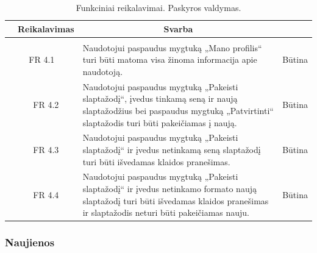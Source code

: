 \documentclass{VUMIFPSkursinis}
\begin{document}
\begin{table}[H]
	\caption{Funkciniai reikalavimai. Paskyros valdymas.}
	\begin{tabular}{|p{1cm}|p{1cm}|p{}|p{}|}
		\hline 
		\rowcolor{gray!50}
		\multicolumn{2}{|c|}{{\bfseries Kodas}}&
		\multicolumn{1}{c|}{{\bfseries Reikalavimas}}&
		\multicolumn{1}{c|}{{\bfseries Svarba}}\\
		\hline
		\rowcolor{lightgray}
		\multicolumn{4}{|c|}{Paskyros valdymas}\\				
		\hline
		\multicolumn{2}{|c|}{FR 4.1}&
		{Naudotojui paspaudus mygtuką „Mano profilis“ turi būti matoma visa žinoma informacija apie naudotoją.
		}&		
		\multicolumn{1}{c|}{Būtina}\\
		\hline
		\multicolumn{1}{|c}{}&
		\multicolumn{1}{c|}{FR 4.2}&
		{Naudotojui paspaudus mygtuką „Pakeisti slaptažodį“, įvedus tinkamą seną ir naują slaptažodžius bei paspaudus mygtuką „Patvirtinti“ slaptažodis turi būti pakeičiamas į naują.
		}&		
		\multicolumn{1}{c|}{Būtina}\\
		\hline
		\multicolumn{1}{|c}{}&
		\multicolumn{1}{c|}{FR 4.3}&
		{Naudotojui paspaudus mygtuką „Pakeisti slaptažodį“ ir įvedus netinkamą seną slaptažodį turi būti išvedamas klaidos pranešimas.
		}&
		\multicolumn{1}{c|}{Būtina}\\	
		\hline		
		\multicolumn{1}{|c}{}&
		\multicolumn{1}{c|}{FR 4.4}&
		{Naudotojui paspaudus mygtuką „Pakeisti slaptažodį“ ir įvedus netinkamo formato naują slaptažodį turi būti išvedamas klaidos pranešimas ir slaptažodis neturi būti pakeičiamas nauju.
		}&
		\multicolumn{1}{c|}{Būtina}\\									
		\hline
	\end{tabular}		
\end{table}

\subsubsection{Naujienos}
\end{document}
